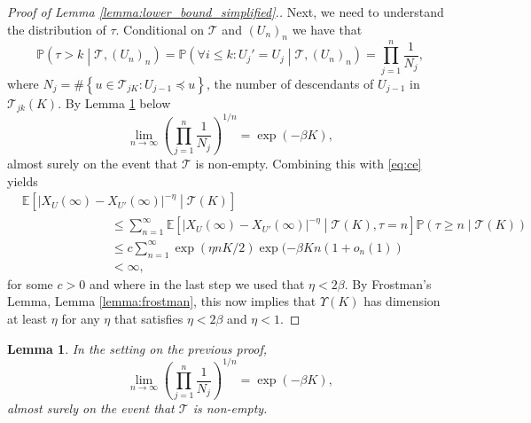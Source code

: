 \documentclass{article}
\newtheorem{lem}[thm]{Lemma}
\theoremstyle{definition}
\numberwithin{equation}{section}
\numberwithin{thm}{section}
\newcommand*{\EE}{\ensuremath{\mathbb{E}}}	        	%
\newcommand*{\PP}{\ensuremath{\mathbb{P}}}	        	%
\begin{document}
\begin{proof}[Proof of Lemma \ref{lemma:lower_bound_simplified}.]
    Next, we need to understand the distribution of $\tau$. Conditional on $\mathcal{T}$ and $(U_n)_n$ we have that
    \begin{equation*}
        \PP\left(\tau>k \middle\vert \mathcal{T}, (U_n)_n\right) =\PP\left(\forall i\leq k: U_j'=U_j \middle\vert \mathcal{T}, (U_n)_n\right)= \prod_{j=1}^n \frac{1}{N_j},
    \end{equation*}
    where $N_j = \# \left\{ u\in \mathcal{T}_{jK}:U_{j-1} \preceq u\right\}$, the number of descendants of $U_{j-1}$ in $\mathcal{T}_{jk}(K)$. {By Lemma \ref{lemma:typical_growth} below}
    \begin{equation*}
        \lim_{n \to \infty}\left(\prod_{j=1}^n \frac{1}{N_j}\right)^{1/n} = \exp(-\beta K),
    \end{equation*}
    almost surely on the event that $\mathcal{T}$ is non-empty.  Combining this with \eqref{eq:ce} yields
    \begin{align*}
        &\EE\left[\vert X_U(\infty) - X_{U'}(\infty)\vert^{-\eta}\middle\vert \mathcal{T}(K) \right] \\
        & \hspace{3cm}\leq \sum_{n=1}^\infty \EE\left[\vert X_U(\infty) - X_{U'}(\infty)\vert^{-\eta}\middle\vert \mathcal{T}(K) , \tau=n\right]\PP\left(\tau\geq n \middle\vert \mathcal{T}(K)\right)\\
        & \hspace{3cm} \leq c\sum_{n=1}^\infty \exp(\eta nK/2)\exp(-\beta K n(1+o_n(1))\\
        & \hspace{3cm} < \infty,
    \end{align*}
    for some $c>0$ and where in the last step we used that $\eta <2 \beta$. By Frostman's Lemma, Lemma \ref{lemma:frostman}, this now implies that $\Upsilon(K)$ has dimension at least $\eta$ for any $\eta$ that satisfies $\eta <2\beta$ and $\eta<1$.
\end{proof}

\begin{lem}\label{lemma:typical_growth}
    In the setting on the previous proof, $$\lim_{n \to \infty}\left(\prod_{j=1}^n \frac{1}{N_j}\right)^{1/n} = \exp(-\beta K),$$ almost surely on the event that $\mathcal{T}$ is non-empty. 
\end{lem}
\end{document}
